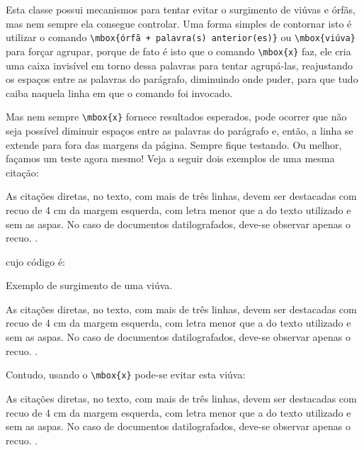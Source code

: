 Esta classe possui mecanismos para tentar evitar o surgimento de viúvas e órfãs, mas nem sempre ela consegue controlar. Uma forma simples de contornar isto é utilizar o comando \Verb|\mbox{órfã + palavra(s) anterior(es)}| ou \Verb+\mbox{viúva}+ para forçar agrupar, porque de fato é isto que o comando \Verb+\mbox{x}+ faz, ele cria uma caixa invisível em torno dessa palavras para tentar agrupá-las, reajustando os espaços entre as palavras do parágrafo, diminuindo onde puder, para que tudo caiba naquela linha em que o comando foi invocado. 

Mas nem sempre \Verb+\mbox{x}+ fornece resultados esperados, pode ocorrer que não seja possível diminuir espaços entre as palavras do parágrafo e, então, a linha se extende para fora das margens da página. Sempre fique testando. Ou melhor, façamos um teste agora mesmo! Veja a seguir dois exemplos de uma mesma citação:

\begin{citacao}
As citações diretas, no texto, com mais de três linhas, devem ser destacadas com recuo de 4 cm da margem esquerda,
com letra menor que a do texto utilizado e sem as aspas. No caso de documentos datilografados, deve-se observar
apenas o recuo. \cite[seção 5.3]{NBR10520:2002}.
\end{citacao}

\noindent
cujo código é:

\begin{codigo}{}{Exemplo de surgimento de uma viúva.}
\begin{citacao}
As citações diretas, no texto, com mais de três linhas, devem ser destacadas com recuo de 4 cm da margem esquerda,
com letra menor que a do texto utilizado e sem as aspas. No caso de documentos datilografados, deve-se observar
apenas o recuo. \cite[seção 5.3]{NBR10520:2002}.
\end{citacao}
\end{codigo}

\noindent
Contudo, usando o \Verb+\mbox{x}+ pode-se evitar esta viúva:

\begin{citacao}
As citações diretas, no texto, com mais de três linhas, devem ser destacadas com recuo de 4 cm da margem esquerda,
com letra menor que a do texto utilizado e sem as aspas. No caso de documentos datilografados, deve-se observar
apenas o recuo. \mbox{\cite[seção 5.3]{NBR10520:2002}.}
\end{citacao}

\noindent
\\

